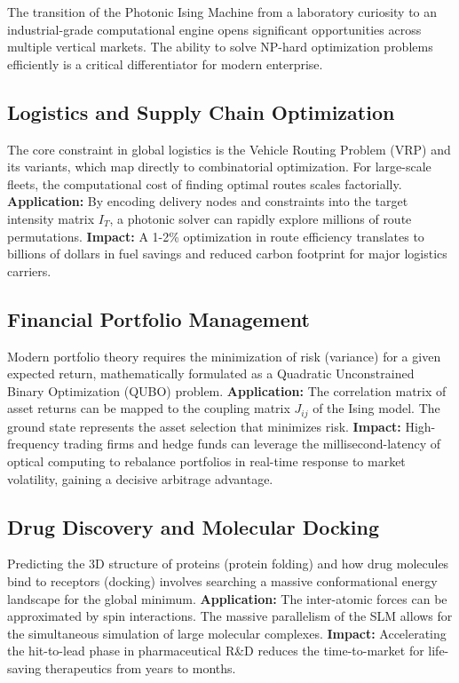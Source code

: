 The transition of the Photonic Ising Machine from a laboratory curiosity to an industrial-grade computational engine opens significant opportunities across multiple vertical markets. The ability to solve NP-hard optimization problems efficiently is a critical differentiator for modern enterprise.

\subsection{Logistics and Supply Chain Optimization}
The core constraint in global logistics is the Vehicle Routing Problem (VRP) and its variants, which map directly to combinatorial optimization. For large-scale fleets, the computational cost of finding optimal routes scales factorially. 
\textbf{Application:} By encoding delivery nodes and constraints into the target intensity matrix $I_T$, a photonic solver can rapidly explore millions of route permutations.
\textbf{Impact:} A 1-2\% optimization in route efficiency translates to billions of dollars in fuel savings and reduced carbon footprint for major logistics carriers.

\subsection{Financial Portfolio Management}
Modern portfolio theory requires the minimization of risk (variance) for a given expected return, mathematically formulated as a Quadratic Unconstrained Binary Optimization (QUBO) problem.
\textbf{Application:} The correlation matrix of asset returns can be mapped to the coupling matrix $J_{ij}$ of the Ising model. The ground state represents the asset selection that minimizes risk.
\textbf{Impact:} High-frequency trading firms and hedge funds can leverage the millisecond-latency of optical computing to rebalance portfolios in real-time response to market volatility, gaining a decisive arbitrage advantage.

\subsection{Drug Discovery and Molecular Docking}
Predicting the 3D structure of proteins (protein folding) and how drug molecules bind to receptors (docking) involves searching a massive conformational energy landscape for the global minimum.
\textbf{Application:} The inter-atomic forces can be approximated by spin interactions. The massive parallelism of the SLM allows for the simultaneous simulation of large molecular complexes.
\textbf{Impact:} Accelerating the hit-to-lead phase in pharmaceutical R\&D reduces the time-to-market for life-saving therapeutics from years to months.


